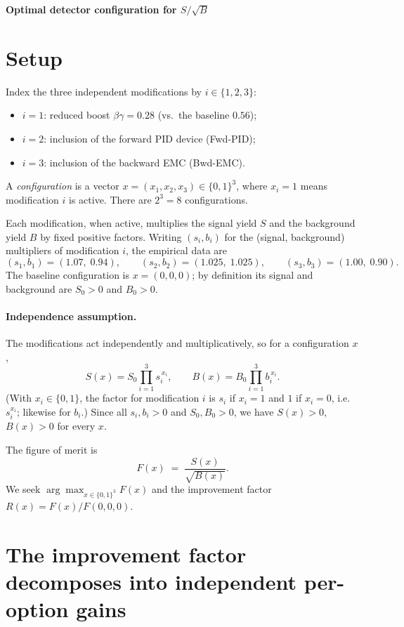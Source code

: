 \documentclass{amsart}
\begin{document}
\begin{center}\large\textbf{Optimal detector configuration for $S/\sqrt{B}$}\end{center}

\section*{Setup}

Index the three independent modifications by $i\in\{1,2,3\}$:
\begin{itemize}
\item $i=1$: reduced boost $\beta\gamma=0.28$ (vs.\ the baseline $0.56$);
\item $i=2$: inclusion of the forward PID device (Fwd-PID);
\item $i=3$: inclusion of the backward EMC (Bwd-EMC).
\end{itemize}
A \emph{configuration} is a vector $x=(x_1,x_2,x_3)\in\{0,1\}^3$, where $x_i=1$
means modification $i$ is active. There are $2^3=8$ configurations.

Each modification, when active, multiplies the signal yield $S$ and the
background yield $B$ by fixed positive factors. Writing $(s_i,b_i)$ for the
(signal, background) multipliers of modification $i$, the empirical data are
\[
(s_1,b_1)=(1.07,\;0.94),\qquad
(s_2,b_2)=(1.025,\;1.025),\qquad
(s_3,b_3)=(1.00,\;0.90).
\]
The baseline configuration is $x=(0,0,0)$; by definition its signal and
background are $S_0>0$ and $B_0>0$.

\paragraph{Independence assumption.}
The modifications act independently and multiplicatively, so for a
configuration $x$,
\[
S(x)=S_0\prod_{i=1}^{3}s_i^{\,x_i},
\qquad
B(x)=B_0\prod_{i=1}^{3}b_i^{\,x_i}.
\]
(With $x_i\in\{0,1\}$, the factor for modification $i$ is $s_i$ if $x_i=1$ and
$1$ if $x_i=0$, i.e.\ $s_i^{x_i}$; likewise for $b_i$.) Since all $s_i,b_i>0$
and $S_0,B_0>0$, we have $S(x)>0$, $B(x)>0$ for every $x$.

The figure of merit is
\[
F(x)\;=\;\frac{S(x)}{\sqrt{B(x)}}.
\]
We seek $\arg\max_{x\in\{0,1\}^3}F(x)$ and the improvement factor
$R(x)=F(x)/F(0,0,0)$.

\section*{The improvement factor decomposes into independent per-option gains}
\end{document}
